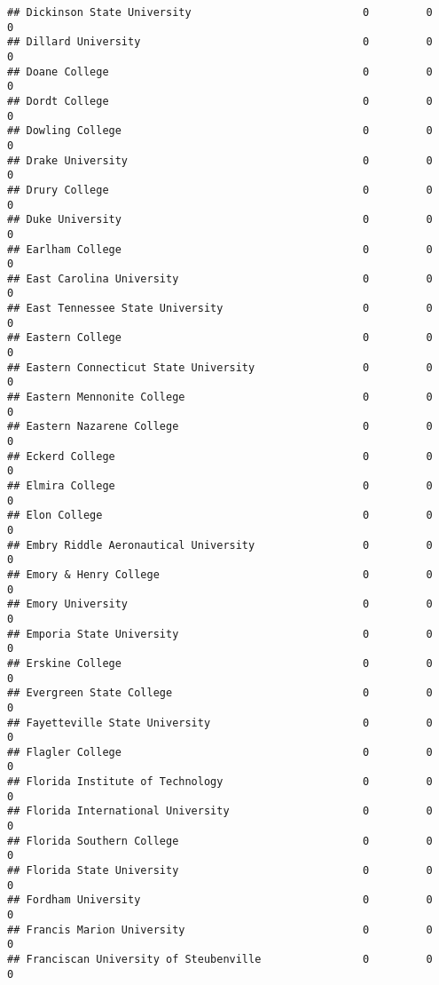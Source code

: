 \documentclass[
]{article}
\begin{document}
\begin{verbatim}
## Dickinson State University                           0         0           0
## Dillard University                                   0         0           0
## Doane College                                        0         0           0
## Dordt College                                        0         0           0
## Dowling College                                      0         0           0
## Drake University                                     0         0           0
## Drury College                                        0         0           0
## Duke University                                      0         0           0
## Earlham College                                      0         0           0
## East Carolina University                             0         0           0
## East Tennessee State University                      0         0           0
## Eastern College                                      0         0           0
## Eastern Connecticut State University                 0         0           0
## Eastern Mennonite College                            0         0           0
## Eastern Nazarene College                             0         0           0
## Eckerd College                                       0         0           0
## Elmira College                                       0         0           0
## Elon College                                         0         0           0
## Embry Riddle Aeronautical University                 0         0           0
## Emory & Henry College                                0         0           0
## Emory University                                     0         0           0
## Emporia State University                             0         0           0
## Erskine College                                      0         0           0
## Evergreen State College                              0         0           0
## Fayetteville State University                        0         0           0
## Flagler College                                      0         0           0
## Florida Institute of Technology                      0         0           0
## Florida International University                     0         0           0
## Florida Southern College                             0         0           0
## Florida State University                             0         0           0
## Fordham University                                   0         0           0
## Francis Marion University                            0         0           0
## Franciscan University of Steubenville                0         0           0

\end{verbatim}
\end{document}
